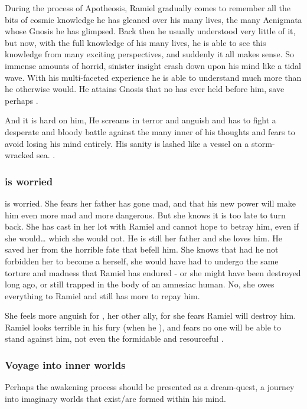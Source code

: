 During the process of Apotheosis, Ramiel gradually comes to remember all the bits of cosmic knowledge he has gleaned over his many lives, the many Aenigmata whose Gnosis he has glimpsed. 
Back then he usually understood very little of it, but now, with the full knowledge of his many lives, he is able to see this knowledge from many exciting perspectives, and suddenly it all makes sense.
So immense amounts of horrid, sinister insight crash down upon his mind like a tidal wave.
With his multi-faceted experience he is able to understand much more than he otherwise would.
He attains Gnosis that no \resphan has ever held before him, save perhaps \Azraid.

And it is hard on him,
He screams in terror and anguish and has to fight a desperate and bloody battle against the many inner \daemons of his thoughts and fears to avoid losing his mind entirely.
His sanity is lashed like a vessel on a storm-wracked sea.
. 





\subsubsection{\Cishiel is worried}
\Cishiel is worried.
She fears her father has gone mad, and that his new power will make him even more mad and more dangerous.
But she knows it is too late to turn back.
She has cast in her lot with Ramiel and cannot hope to betray him, even if she would\ldots{} which she would not.
He is still her father and she loves him. 
He saved her from the horrible fate that befell him.
She knows that had he not forbidden her to become a \malach herself, she would have had to undergo the same torture and madness that Ramiel has endured - or she might have been destroyed long ago, or still trapped in the body of an amnesiac human.
No, she owes everything to Ramiel and still has more to repay him.

She feels more anguish for \Dasteron, her other ally, for she fears Ramiel will destroy him.
Ramiel looks terrible in his fury (when he ), and \Cishiel fears no one will be able to stand against him, not even the formidable and resourceful \Dasteron.





\subsubsection{Voyage into inner worlds}
Perhaps the awakening process should be presented as a dream-quest, a journey into imaginary worlds that exist/are formed within his mind. 

